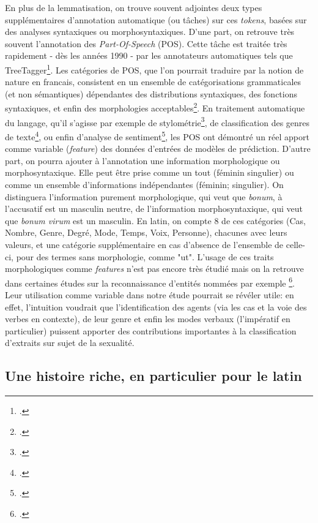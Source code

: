 En plus de la lemmatisation, on trouve souvent adjointes deux types supplémentaires  d'annotation automatique (ou tâches) sur ces \textit{tokens}, basées sur des analyses syntaxiques ou morphosyntaxiques. D'une part, on retrouve très souvent l'annotation des \textit{Part-Of-Speech} (POS). Cette tâche est traitée très rapidement - dès les années 1990 - par les annotateurs automatiques tels que TreeTagger\footcite{schmid1994treetagger}. Les catégories de POS, que l'on pourrait traduire par la notion de nature en francais, consistent en un ensemble de catégorisations grammaticales (et non sémantiques) dépendantes des distributions syntaxiques, des fonctions syntaxiques, et enfin des morphologies acceptables\footcite{schachter1985parts}. En traitement automatique du langage, qu'il s'agisse par exemple de stylométrie\footcite{Cafieroeaax5489}, de classification des genres de texte\footcite{feldman2009part}, ou enfin d'analyse de sentiment\footcite{wang2015pos}, les POS ont démontré un réel apport comme variable (\textit{feature}) des données d'entrées de modèles de prédiction. D'autre part, on pourra ajouter à l'annotation une information morphologique ou morphosyntaxique. Elle peut être prise comme un tout (féminin singulier) ou comme un ensemble d'informations indépendantes (féminin; singulier). On distinguera l'information purement morphologique, qui veut que \textit{bonum}, à l'accusatif est un masculin neutre, de l'information morphosyntaxique, qui veut que \textit{bonum virum} est un masculin. En latin, on compte 8 de ces catégories (Cas, Nombre, Genre, Degré, Mode, Temps, Voix, Personne), chacunes avec leurs valeurs, et une catégorie supplémentaire en cas d'absence de l'ensemble de celle-ci, pour des termes sans morphologie, comme "ut". L'usage de ces traits morphologiques comme \textit{features} n'est pas encore très étudié %
mais on la retrouve dans certaines études sur la reconnaissance d'entités nommées par exemple \footcite[Par exemple]{zirikly2014named}. Leur utilisation comme variable dans notre étude pourrait se révéler utile: en effet, l'intuition voudrait que l'identification des agents (via les cas et la voie des verbes en contexte), de leur genre et enfin les modes verbaux (l'impératif en particulier) puissent apporter des contributions importantes à la classification d'extraits sur sujet de la sexualité.


\subsection{Une histoire riche, en particulier pour le latin}


